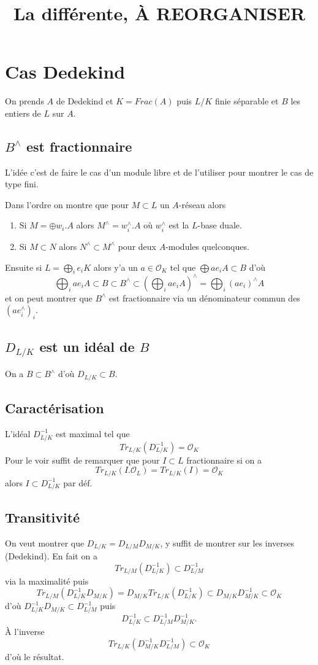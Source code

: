 \documentclass[a4paper,12pt]{book}
\title{La différente, À REORGANISER}
\date{}
\newcommand{\Or}{\mathcal{O}}
\theoremstyle{plain}
\theoremstyle{definition}
\theoremstyle{remark}
\begin{document}
\maketitle
\section{Cas Dedekind}
On prends $A$ de Dedekind et $K=Frac(A)$ puis $L/K$
finie séparable et $B$ les entiers de $L$ sur $A$.
\subsection{$B^\wedge$ est fractionnaire}

L'idée c'est de faire le cas d'un module libre et 
de l'utiliser pour montrer le cas de type fini.

Dans l'ordre on montre que pour $M\subset L$ un 
$A$-réseau alors
\begin{enumerate}
    \item Si $M=\oplus w_i.A$ alors $M^\wedge=w_i^\wedge.A$ où $w_i^\wedge$ est la $L$-base duale.
    \item Si $M\subset N$ alors $N^\wedge\subset M^\wedge$ pour deux $A$-modules quelconques.
\end{enumerate}
Ensuite si $L=\bigoplus_i e_iK$ alors y'a un $a\in \Or_K$
tel que $\bigoplus ae_iA\subset B$ d'où
\[\bigoplus_i ae_iA\subset B\subset B^\wedge\subset (\bigoplus_i ae_iA)^\wedge=\bigoplus_i (ae_i)^\wedge A\]
et on peut montrer que $B^\wedge$ est fractionnaire
via un dénominateur commun des $(ae_i^\wedge)_i$.

\subsection{$D_{L/K}$ est un idéal de $B$}
On a $B\subset B^\wedge$ d'où $D_{L/K}\subset B$.

\subsection{Caractérisation}
L'idéal $D_{L/K}^{-1}$ est maximal tel que 
\[Tr_{L/K}(D_{L/K}^{-1})=\Or_K\]
Pour le voir suffit de remarquer que pour $I\subset L$
fractionnaire si on a 
\[Tr_{L/K}(I.\Or_L)=Tr_{L/K}(I)=\Or_K\]
alors $I\subset D_{L/K}^{-1}$ par déf.

\subsection{Transitivité}
On veut montrer que $D_{L/K}=D_{L/M}D_{M/K}$, y suffit
de montrer sur les inverses (Dedekind). En fait on a
\[Tr_{L/M}(D_{L/K}^{-1})\subset D_{L/M}^{-1}\]
via la maximalité puis
\[Tr_{L/M}(D_{L/K}^{-1}D_{M/K})=D_{M/K}Tr_{L/K}(D_{L/K}^{-1})\subset D_{M/K}D_{M/K}^{-1}\subset\Or_K\]
d'où $D_{L/K}^{-1}D_{M/K}\subset D_{L/M}^{-1}$ puis
\[D_{L/K}^{-1}\subset D_{L/M}^{-1}D_{M/K}^{-1}.\]
À l'inverse 
\[Tr_{L/K}(D_{M/K}^{-1}D_{L/M}^{-1})\subset \Or_K\]
d'où le résultat.
\end{document}
